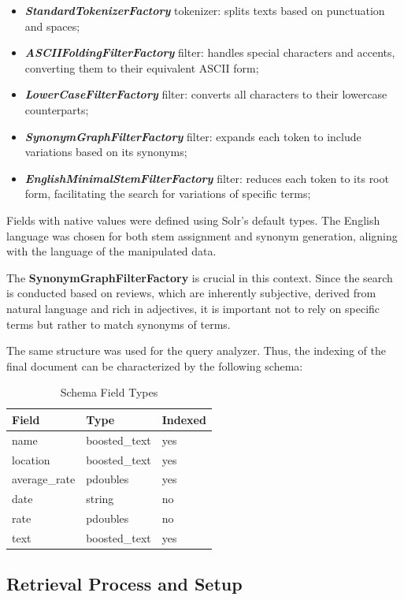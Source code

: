 \documentclass[sigconf]{acmart}
\begin{document}
\begin{itemize}
    \item \textbf{\textit{StandardTokenizerFactory}} tokenizer: splits texts based on punctuation and spaces; 
    \item \textbf{\textit{ASCIIFoldingFilterFactory}} filter: handles special characters and accents, converting them to their equivalent ASCII form;
    \item \textbf{\textit{LowerCaseFilterFactory}} filter: converts all characters to their lowercase counterparts;
    \item \textbf{\textit{SynonymGraphFilterFactory}} filter: expands each token to include variations based on its synonyms;
    \item \textbf{\textit{EnglishMinimalStemFilterFactory}} filter: reduces each token to its root form, facilitating the search for variations of specific terms;
\end{itemize}

Fields with native values were defined using Solr's default types. The English language was chosen for both stem assignment and synonym generation, aligning with the language of the manipulated data.

The \textbf{SynonymGraphFilterFactory} is crucial in this context. Since the search is conducted based on reviews, which are inherently subjective, derived from natural language and rich in adjectives, it is important not to rely on specific terms but rather to match synonyms of terms.

The same structure was used for the query analyzer. Thus, the indexing of the final document can be characterized by the following schema:

\begin{table}[H]
\caption{Schema Field Types}
\label{tab:schema_types}
\begin{tabular}{lll}
\toprule
Field & Type & Indexed\\
\midrule
name & boosted\_text & yes\\
location & boosted\_text & yes\\
average\_rate & pdoubles & yes\\
date & string & no \\
rate & pdoubles & no \\
text & boosted\_text & yes \\
\bottomrule
\end{tabular}
\end{table}

\subsection{Retrieval Process and Setup}
\end{document}
